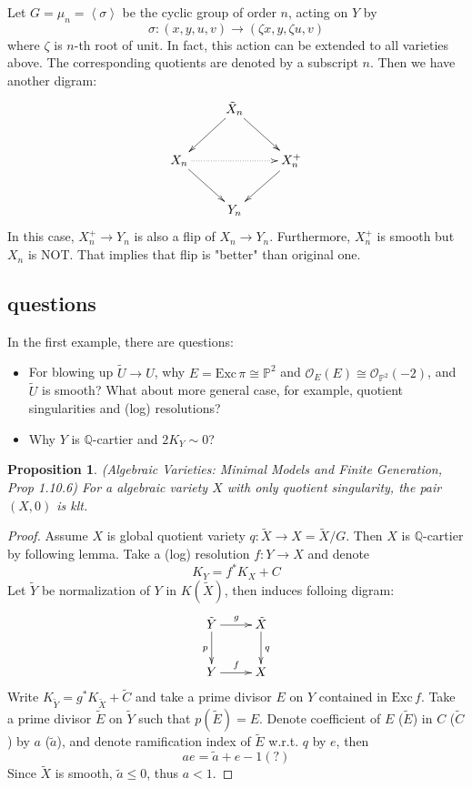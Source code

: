 \documentclass{article}
\newtheorem{prop}[defn]{Proposition}
\begin{document}
Let $ G=\mu_n=\left <\sigma\right > $ be the cyclic group of order $ n $, acting on $ Y $ by 
\[ \sigma: (x,y,u,v)\to (\zeta x,y,\zeta u,v) \]
where $ \zeta $ is $ n $-th root of unit. In fact, this action can be extended to all varieties above. The corresponding quotients are denoted by a subscript $ n $. Then we have another digram:
$$ \xymatrix{
  &\tilde{X}_n\ar[ld]\ar[rd]&\\
  X_n\ar[rd]\ar@{.>}[rr]&&X^+_n\ar[ld]\\
  &Y_n&
} $$ 
In this case, $ X^+_n\to Y_n $ is also a flip of $ X_n\to Y_n $. Furthermore, $ X^+_n $ is smooth but $ X_n $ is NOT. That implies that flip is "better" than original one.
\subsection{questions}
In the first example, there are questions:
\begin{itemize}
  \item  For blowing up $ \tilde{U}\to U $, why $ E=\mathrm{Exc}\,\pi\cong \mathbb{P}^2 $ and $ \mathcal{O}_E(E)\cong \mathcal{O}_{\mathbb{P}^2}(-2) $, and $ \tilde{U} $ is smooth? What about more general case, for example, quotient singularities and (log) resolutions?
  \item Why $ Y $ is $ \mathbb{Q} $-cartier and $ 2K_Y\sim 0 $?
\end{itemize}

\begin{prop}
  (Algebraic Varieties: Minimal Models and Finite Generation, Prop 1.10.6) For a algebraic variety $ X $ with only quotient singularity, the pair $ (X,0) $ is klt.
\end{prop}
\begin{proof}
  Assume $ X $ is global quotient variety $ q:\tilde{X}\to X=\tilde{X}/G $. Then $ X $ is $ \mathbb{Q} $-cartier by following lemma. Take a (log) resolution $ f:Y\to X $ and denote 
  \[ K_Y=f^*K_X+C \]
  Let $ \tilde{Y} $ be normalization of $ Y $ in $ K(\tilde{X}) $, then induces folloing digram:
  \[ \xymatrix{
    \tilde{Y}\ar[r]^{g}\ar[d]_{p}&\tilde{X}\ar[d]^q\\
    Y\ar[r]^f&X
  } \]
  Write $ K_{\tilde{Y}}=g^*K_{\tilde{X}}+\tilde{C} $ and take a prime divisor $ E $ on $ Y $ contained in $ \mathrm{Exc}\, f $. Take a prime divisor $ \tilde{E} $ on $ \tilde{Y} $ such that $ p(\tilde{E})=E $. Denote coefficient of $ E $ ($ \tilde{E} $) in $ C $ ($ \tilde{C} $) by $ a $ ($ \tilde{a} $), and denote ramification index of $ \tilde{E} $ w.r.t. $ q $ by $ e $, then
  \[ ae=\tilde{a}+e-1 (?)\]
  Since $ \tilde{X} $ is smooth,  $ \tilde{a}\leqslant0 $, thus $ a<1 $.
\end{proof}
\end{document}
